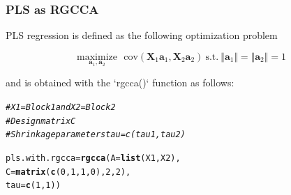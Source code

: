\documentclass[10pt,xcolor=dvipsnames]{beamer}\usepackage[]{graphicx}\usepackage[]{color}
\makeatletter
\newcommand{\hlnum}[1]{\textcolor[rgb]{0.686,0.059,0.569}{#1}}%
\newcommand{\hlcom}[1]{\textcolor[rgb]{0.678,0.584,0.686}{\textit{#1}}}%
\newcommand{\hlstd}[1]{\textcolor[rgb]{0.345,0.345,0.345}{#1}}%
\newcommand{\hlkwb}[1]{\textcolor[rgb]{0.69,0.353,0.396}{#1}}%
\newcommand{\hlkwc}[1]{\textcolor[rgb]{0.333,0.667,0.333}{#1}}%
\newcommand{\hlkwd}[1]{\textcolor[rgb]{0.737,0.353,0.396}{\textbf{#1}}}%
\newenvironment{kframe}{%
 \def\at@end@of@kframe{}%
 \ifinner\ifhmode%
  \def\at@end@of@kframe{\end{minipage}}%
  \begin{minipage}{\columnwidth}%
 \fi\fi%
 \def\FrameCommand##1{\hskip\@totalleftmargin \hskip-\fboxsep
 \colorbox{shadecolor}{##1}\hskip-\fboxsep
     \hskip-\linewidth \hskip-\@totalleftmargin \hskip\columnwidth}%
 \MakeFramed {\advance\hsize-\width
   \@totalleftmargin\z@ \linewidth\hsize
   \@setminipage}}%
 {\par\unskip\endMakeFramed%
 \at@end@of@kframe}
\newenvironment{knitrout}{}{} %
\newcommand{\X}{\mathbf{X}}
\newcommand{\ma}[1]{\ensuremath{\mathbf{#1}}}
\makeatother
\begin{document}
\begin{frame}\frametitle{PLS as RGCCA}
PLS regression is defined as the following optimization problem 

\begin{equation*}
\underset{\ma a_1, \ma a_2}{\text{maximize}} \text{
~~cov}\left(\X_1\ma a_1, \X_2\ma a_2 \right) \mathrm{~s.t.~} \Vert \ma a_1 \Vert = \Vert \ma a_2 \Vert = 1
\label{PLS}
\end{equation*}

and is obtained with the `rgcca()` function as follows:


\begin{knitrout}\footnotesize
{}\color{fgcolor}\begin{kframe}
\begin{alltt}
\hlcom{# X1 = Block1 and X2 = Block2 }
\hlcom{# Design matrix C}
\hlcom{# Shrinkage parameters tau = c(tau1, tau2)}

\hlstd{pls.with.rgcca} \hlkwb{=} \hlkwd{rgcca}\hlstd{(}\hlkwc{A}\hlstd{=} \hlkwd{list}\hlstd{(X1, X2),}
                       \hlkwc{C} \hlstd{=} \hlkwd{matrix}\hlstd{(}\hlkwd{c}\hlstd{(}\hlnum{0}\hlstd{,} \hlnum{1}\hlstd{,} \hlnum{1}\hlstd{,} \hlnum{0}\hlstd{),} \hlnum{2}\hlstd{,} \hlnum{2}\hlstd{),}
                       \hlkwc{tau} \hlstd{=} \hlkwd{c}\hlstd{(}\hlnum{1}\hlstd{,} \hlnum{1}\hlstd{))}
\end{alltt}
\end{kframe}
\end{knitrout}


\end{frame}
\end{document}
